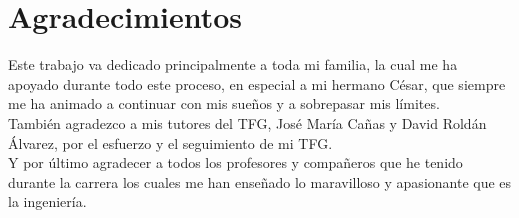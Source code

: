 \newpage
\mbox{}
\thispagestyle{plain}			%
\section*{Agradecimientos}
Este trabajo va dedicado principalmente a toda mi familia, la cual me ha apoyado durante todo este proceso, en especial a mi hermano César, que siempre me ha animado a continuar con mis sueños y a sobrepasar mis límites. \\

También agradezco a mis tutores del TFG, José María Cañas y David Roldán Álvarez, por el esfuerzo y el seguimiento de mi TFG. \\

Y por último agradecer a todos los profesores y compañeros que he tenido durante la carrera los cuales me han enseñado lo maravilloso y apasionante que es la ingeniería. \\








